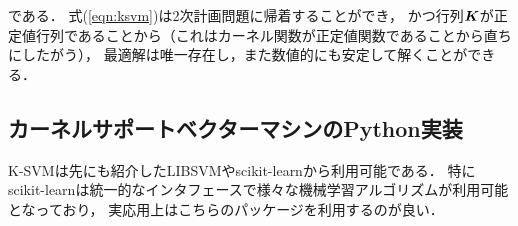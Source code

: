 である．
式(\ref{eqn:ksvm})は2次計画問題に帰着することができ，
かつ行列$\boldsymbol{K}$が正定値行列であることから（これはカーネル関数が正定値関数であることから直ちにしたがう），
最適解は唯一存在し，また数値的にも安定して解くことができる．


\subsection{カーネルサポートベクターマシンのPython実装}

K-SVMは先にも紹介したLIBSVMやscikit-learnから利用可能である．
特にscikit-learnは統一的なインタフェースで様々な機械学習アルゴリズムが利用可能となっており，
実応用上はこちらのパッケージを利用するのが良い．

